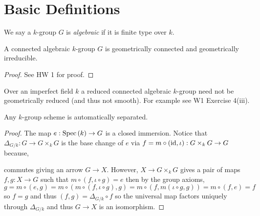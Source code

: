 \documentclass[12pt]{article}
\begin{document}
\section{Basic Definitions}

\begin{defn}
We say a $k$-group $G$ is \textit{algebraic} if it is finite type over $k$.
\end{defn}

\begin{prop}
A connected algebraic $k$-group $G$ is geometrically connected and geometrically irreducible.
\end{prop}

\begin{proof}
See HW 1 for proof.
\end{proof}

\begin{rmk}
Over an imperfect field $k$ a reduced connected algebraic $k$-group need not be geometrically reduced (and thus not smooth). For example see W1 Exercise
4(iii).
\end{rmk}

\begin{prop}
Any $k$-group scheme is automatically separated.
\end{prop}

\begin{proof}
The map $e : \mathrm{Spec}\left( k \right) \to G$ is a closed immersion. Notice that $\Delta_{G/k} : G \to G \times_k G$ is the base change of $e$ via $f = m \circ (\mathrm{id}, \iota) : G \times_k G \to G$ because,
\begin{center}
\end{center}
commutes giving an arrow $G \to X$. However, $X \to G \times_k G$ gives a pair of maps $f,g : X \to G$ such that $m \circ (f, \iota \circ g) = e$ then by the group axioms,
\[ g = m \circ (e, g) = m \circ (m \circ (f, \iota \circ g), g) = m \circ (f, m(\iota \circ g, g)) = m \circ (f, e) = f \]
so $f = g$ and thus $(f,g) = \Delta_{G/k} \circ f$ so the universal map factors uniquely through $\Delta_{G/k}$ and thus $G \to X$ is an isomorphism. 
\end{proof}
\end{document}
